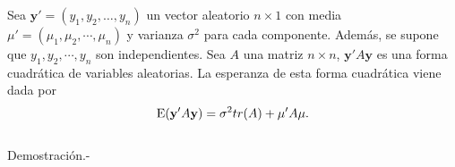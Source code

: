 \begin{teo}
    Sea $\textbf{y}'=(y_1,y_2,\ldots,y_n)$ un vector aleatorio $n\times 1$ con media $\mu'=(\mu_1,\mu_2,\cdots,\mu_n)$ y varianza $\sigma^2$ para cada componente. Además, se supone que $y_1,y_2,\cdots,y_n$ son independientes. Sea $A$ una matriz $n\times n$, $\textbf{y}'A\textbf{y}$ es una forma cuadrática de variables aleatorias. La esperanza de esta forma cuadrática viene dada por
    $$\mathop{\mbox{\normalfont E}}\nolimits(\textbf{y}'A\textbf{y})=\sigma^2tr(A)+\mu'A\mu.$$\\
	Demostración.-\;
\end{teo}


